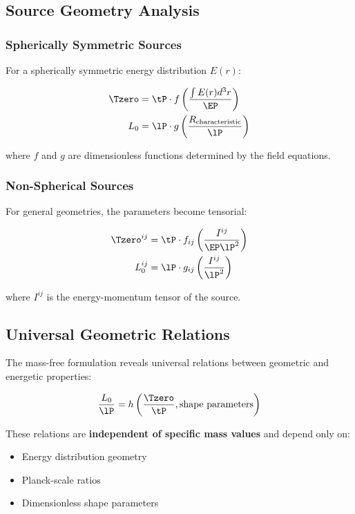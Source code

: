 	\subsection{Source Geometry Analysis}
	\label{subsec:source_geometry}
	
	\subsubsection{Spherically Symmetric Sources}
	
	For a spherically symmetric energy distribution $E(r)$:
	
	\begin{align}
		\Tzero &= \tP \cdot f\left(\frac{\int E(r) d^3r}{\EP}\right) \\
		L_0 &= \lP \cdot g\left(\frac{R_{\text{characteristic}}}{\lP}\right)
	\end{align}
	
	where $f$ and $g$ are dimensionless functions determined by the field equations.
	
	\subsubsection{Non-Spherical Sources}
	
	For general geometries, the parameters become tensorial:
	
	\begin{align}
		\Tzero^{ij} &= \tP \cdot f_{ij}\left(\frac{I^{ij}}{\EP \lP^2}\right) \\
		L_0^{ij} &= \lP \cdot g_{ij}\left(\frac{I^{ij}}{\lP^2}\right)
	\end{align}
	
	where $I^{ij}$ is the energy-momentum tensor of the source.
	
	\subsection{Universal Geometric Relations}
	\label{subsec:geometric_relations}
	
	The mass-free formulation reveals universal relations between geometric and energetic properties:
	
	\begin{equation}
		\frac{L_0}{\lP} = h\left(\frac{\Tzero}{\tP}, \text{shape parameters}\right)
		\label{eq:geometric_relation}
	\end{equation}
	
	These relations are \textbf{independent of specific mass values} and depend only on:
	\begin{itemize}
		\item Energy distribution geometry
		\item Planck-scale ratios
		\item Dimensionless shape parameters
	\end{itemize}
	
